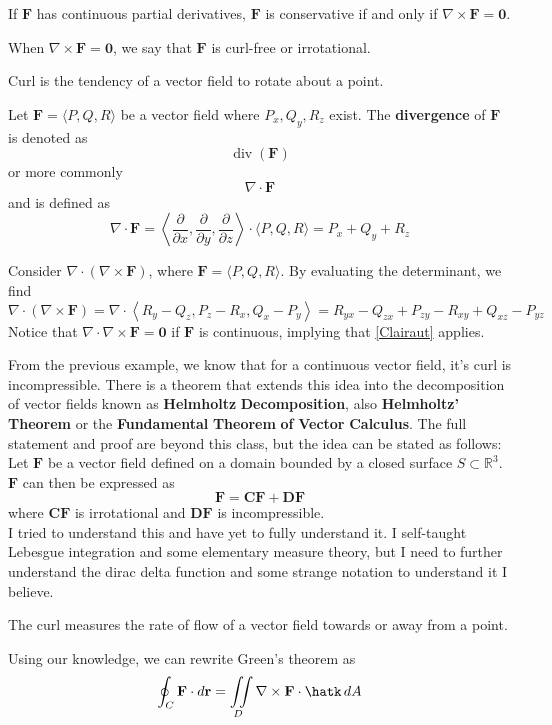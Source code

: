 \begin{theorem}
    If \(\mathbf{F}\) has continuous partial derivatives, \(\mathbf{F}\) is conservative if and only if \(\nabla \times \mathbf{F}=\mathbf{0}\).
\end{theorem}
When \(\nabla \times \mathbf{F}=\mathbf{0}\), we say that \(\mathbf{F}\) is curl-free or irrotational.
\begin{intuition}
    Curl is the tendency of a vector field to rotate about a point.
\end{intuition}
\begin{definition}[Divergence]
    Let \(\mathbf{F}=\langle P,Q,R \rangle \) be a vector field where \(P_x,Q_y,R_z\) exist. The \textbf{divergence} of \(\mathbf{F}\) is denoted as 
    \[
        \operatorname{div}(\mathbf{F})
    \]
    or more commonly
    \[
        \nabla \cdot \mathbf{F}
    \]
    and is defined as 
    \[
        \nabla \cdot \mathbf{F}= \left\langle \frac{\partial}{\partial x},\frac{\partial}{\partial y},\frac{\partial}{\partial z} \right\rangle \cdot \langle P,Q,R \rangle =P_x +Q_y +R_z
    \]
\end{definition}
\begin{eg}
    Consider \(\nabla \cdot (\nabla \times \mathbf{F})\), where \(\mathbf{F}=\langle P,Q,R \rangle \). By evaluating the determinant, we find
    \[
        \nabla \cdot (\nabla \times \mathbf{F})=\nabla \cdot \left\langle R_y -Q_z,P_z -R_x, Q_x -P_y \right\rangle = R_{yx}-Q_{zx}+P_{zy}-R_{xy} +Q_{xz} -P_{yz} 
    \]
    Notice that \(\nabla \cdot \nabla \times \mathbf{F}=\mathbf{0}\) if \(\mathbf{F}\) is continuous, implying that \ref{Clairaut} applies.
\end{eg}
From the previous example, we know that for a continuous vector field, it's curl is incompressible. There is a theorem that extends this idea into the decomposition of vector fields known as \textbf{Helmholtz} \textbf{Decomposition}, also \textbf{Helmholtz' Theorem} or the \textbf{Fundamental} \textbf{Theorem} \textbf{of} \textbf{Vector} \textbf{Calculus}. The full statement and proof are beyond this class, but the idea can be stated as follows:\\
Let \(\mathbf{F} \) be a vector field defined on a domain bounded by a closed surface \(S\subset \mathbb{R} ^3\). \(\mathbf{F} \) can then be expressed as 
\[
    \mathbf{F} = \mathbf{CF} +\mathbf{DF} 
\]
where \(\mathbf{CF} \) is irrotational and \(\mathbf{DF} \) is incompressible.\\
I tried to understand this and have yet to fully understand it. I self-taught Lebesgue integration and some elementary measure theory, but I need to further understand the dirac delta function and some strange notation to understand it I believe.
\begin{intuition}
    The curl measures the rate of flow of a vector field towards or away from a point.
\end{intuition}
Using our knowledge, we can rewrite Green's theorem as 
\[
    \oint_C \mathbf{F}\cdot d \mathbf{r} = \iint\limits_{D} \nabla \times \mathbf{F}\cdot \hatk\,dA
\]
